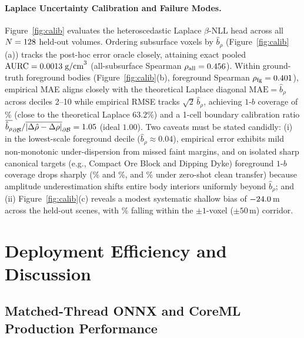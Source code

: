 \documentclass[11pt,a4paper]{article}
\begin{document}
\paragraph{Laplace Uncertainty Calibration and Failure Modes.}
Figure~\ref{fig:calib} evaluates the heteroscedastic Laplace $\beta$-NLL head across all $N=128{}$ held-out volumes. Ordering subsurface voxels by $\hat{b}_\rho$ (Figure~\ref{fig:calib}(a)) tracks the post-hoc error oracle closely, attaining exact pooled $\mathrm{AURC} = 0.0013{}\;\text{g/cm}^3$ (all-subsurface Spearman $\rho_{\mathrm{all}} = 0.456{}$). Within ground-truth foreground bodies (Figure~\ref{fig:calib}(b), foreground Spearman $\rho_{\mathrm{fg}} = 0.401{}$), empirical MAE aligns closely with the theoretical Laplace diagonal $\text{MAE} = \hat{b}_\rho$ across deciles 2--10 while empirical RMSE tracks $\sqrt{2}\,\hat{b}_\rho$, achieving $1$-$b$ coverage of \valCompFgCov{}\% (close to the theoretical Laplace $63.2\%$) and a 1-cell boundary calibration ratio $\overline{\hat{b}_\rho}_{\partial\mathcal{B}} / \overline{|\Delta\hat{\rho}-\Delta\rho|}_{\partial\mathcal{B}} = 1.05{}$ (ideal $1.00$). Two caveats must be stated candidly: (i) in the lowest-scale foreground decile ($\hat{b}_\rho \approx 0.04$), empirical error exhibits mild non-monotonic under-dispersion from missed faint margins, and on isolated sharp canonical targets (e.g., Compact Ore Block and Dipping Dyke) foreground $1$-$b$ coverage drops sharply (\valCanonSwinOreCov{}\% and \valCanonSwinDykeCov{}\%, and \valCleanHardXferCov{}\% under zero-shot clean transfer) because amplitude underestimation shifts entire body interiors uniformly beyond $\hat{b}_\rho$; and (ii) Figure~\ref{fig:calib}(c) reveals a modest systematic shallow bias of $-24.0{}$\,m across the \valNBucketTotal{} held-out scenes, with \valCompCentroidWithinFifty{}\% falling within the $\pm 1$-voxel ($\pm 50$\,m) corridor.

\section{Deployment Efficiency and Discussion}
\label{sec:deploy_discuss}

\subsection{Matched-Thread ONNX and CoreML Production Performance}
\end{document}
